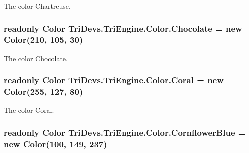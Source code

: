 The color Chartreuse. 

\hypertarget{struct_tri_devs_1_1_tri_engine_1_1_color_aa8052b86fd2d5541c792273b6ad18fe2}{
\subsubsection[{Chocolate}]{\setlength{\rightskip}{0pt plus 5cm}readonly {\bf Color} Tri\-Devs.\-Tri\-Engine.\-Color.\-Chocolate = new {\bf Color}(210, 105, 30)\hspace{0.3cm}{\ttfamily [static]}}}\label{struct_tri_devs_1_1_tri_engine_1_1_color_aa8052b86fd2d5541c792273b6ad18fe2}


The color Chocolate. 

\hypertarget{struct_tri_devs_1_1_tri_engine_1_1_color_a9869f5d817a1f38ba5e503950e906ba8}{
\subsubsection[{Coral}]{\setlength{\rightskip}{0pt plus 5cm}readonly {\bf Color} Tri\-Devs.\-Tri\-Engine.\-Color.\-Coral = new {\bf Color}(255, 127, 80)\hspace{0.3cm}{\ttfamily [static]}}}\label{struct_tri_devs_1_1_tri_engine_1_1_color_a9869f5d817a1f38ba5e503950e906ba8}


The color Coral. 

\hypertarget{struct_tri_devs_1_1_tri_engine_1_1_color_a5109776f06564614216e7f23e5e54cbb}{
\subsubsection[{Cornflower\-Blue}]{\setlength{\rightskip}{0pt plus 5cm}readonly {\bf Color} Tri\-Devs.\-Tri\-Engine.\-Color.\-Cornflower\-Blue = new {\bf Color}(100, 149, 237)\hspace{0.3cm}{\ttfamily [static]}}}\label{struct_tri_devs_1_1_tri_engine_1_1_color_a5109776f06564614216e7f23e5e54cbb}


